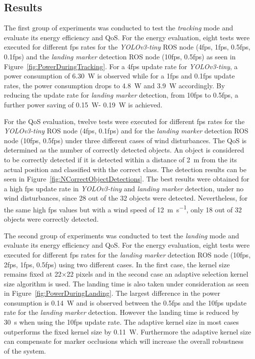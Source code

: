 \documentclass[conference]{IEEEtran}
\begin{document}
\subsection{Results}

The first group of experiments was conducted to test the \emph{tracking} mode and evaluate its 
energy efficiency and QoS. For the energy 
evaluation, eight tests were executed for different fps rates 
for the \emph{YOLOv3-tiny} ROS node (4fps, 1fps, 0.5fps, 0.1fps) and 
the \emph{landing marker} detection ROS node (10fps, 0.5fps) as 
%
seen in Figure~\ref{fig:PowerDuringTracking}. For a 4fps update rate
for \emph{YOLOv3-tiny}, a power consumption of \SI{6.30}{\watt} is observed while
for a 1fps and 0.1fps update rates, the power consumption drops to
\SI{4,8}{\watt} and \SI{3.9}{\watt} accordingly. By reducing the update rate for
\emph{landing marker} detection, from 10fps to 0.5fps, a further power
saving of \SI{0.15}{\watt}- \SI{0.19}{\watt} is achieved.



For the QoS evaluation, twelve tests were executed for different 
fps rates for the \emph{YOLOv3-tiny} ROS node (4fps, 0.1fps) and for 
the \emph{landing marker} detection ROS node (10fps, 0.5fps) under 
three different cases of wind disturbances. 
%
The QoS is determined as the number of correctly detected objects. An
object is considered to be correctly detected if it is detected within
a distance of \SI{2}{\meter} from the its actual position and classified with
the correct class. The detection results can be seen in
Figure~\ref{fig:NCorrectObjectDetections}. The best results were
obtained for a high fps update rate in \emph{YOLOv3-tiny} and \emph{landing marker} detection, under no wind disturbances, since 28 out of the 32
objects were detected. Nevertheless, for the same high fps values but
with a wind speed of \SI{12}{\meter \per \second}, only 18 out of 32 objects were
correctly detected.






The second group of experiments was conducted to test the \emph{landing} mode
and evaluate its energy efficiency and QoS.
For the energy evaluation, eight tests were executed for different 
fps rates for the \emph{landing marker} detection ROS node 
(10fps, 2fps, 1fps, 0.5fps) using two different cases. 
In the first case, the kernel size remains fixed at 
22$\times$22 pixels and in the second case an adaptive selection 
kernel size algorithm is used. 
%
The landing time is also taken under consideration as seen in
Figure~\ref{fig:PowerDuringLanding}. The largest difference in the
power consumption is \SI{0.14}{\watt} and is observed between the 0.5fps and
the 10fps update rate for the \emph{landing marker} detection. However
the landing time is reduced by \SI{30}{\second} when using the 10fps update
rate. The adaptive kernel size in most cases outperforms the fixed
kernel size by \SI{0.11}{\watt}. Furthermore the adaptive kernel size can
compensate for marker occlusions which will increase the overall
robustness of the system.
\end{document}
